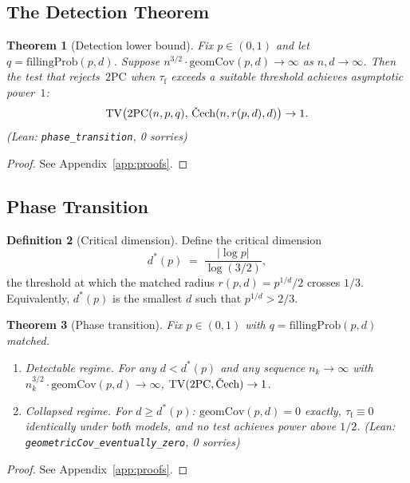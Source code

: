 \documentclass[reqno,12pt]{amsart}
\newcommand{\tauf}{\tau_{\mathrm{f}}}
\newcommand{\PC}{\mathrm{2PC}}
\newcommand{\Cech}{\ifmmode\text{\v{C}ech}\else\v{C}ech\fi}  %
\newcommand{\TV}{\mathrm{TV}}
\newcommand{\geomCov}{\mathrm{geomCov}}
\newcommand{\fillingP}{\mathrm{fillingProb}}
\newcommand{\leanverified}[1]{\textup{(Lean: \texttt{#1}, 0 sorries)}}
\theoremstyle{plain}
\newtheorem{theorem}{Theorem}[section]
\theoremstyle{definition}
\newtheorem{definition}[theorem]{Definition}
\theoremstyle{remark}
\begin{document}
\subsection{The Detection Theorem}

\begin{theorem}[Detection lower bound]\label{thm:detection}
Fix $p\in(0,1)$ and let $q = \fillingP(p,d)$. Suppose
$n^{3/2}\cdot\geomCov(p,d)\to\infty$ as $n,d\to\infty$.
Then the test that rejects~$\PC$ when $\tauf$ exceeds a suitable threshold achieves
asymptotic power~$1$:
\[
  \TV\bigl(\PC(n,p,q),\,\Cech(n,r(p,d),d)\bigr)\to 1.
\]
\hfill \leanverified{phase\_transition}
\end{theorem}

\begin{proof}
See Appendix~\ref{app:proofs}.
\end{proof}

\subsection{Phase Transition}

\begin{definition}[Critical dimension]\label{def:critical-dim}
Define the critical dimension
\begin{equation}\label{eq:critical-dim}
  d^*(p) \;=\; \frac{|\log p|}{\log(3/2)},
\end{equation}
the threshold at which the matched radius $r(p,d) = p^{1/d}/2$ crosses $1/3$.
Equivalently, $d^*(p)$ is the smallest $d$ such that $p^{1/d} > 2/3$.
\end{definition}

\begin{theorem}[Phase transition]\label{thm:phase-transition}
Fix $p\in(0,1)$ with $q = \fillingP(p,d)$ matched.
\begin{enumerate}[label=(\alph*)]
\item \textit{Detectable regime.} For any $d < d^*(p)$ and any sequence $n_k\to\infty$
  with $n_k^{3/2}\cdot\geomCov(p,d)\to\infty$,
  $\TV(\PC,\Cech)\to 1$.
\item \textit{Collapsed regime.} For $d \geq d^*(p)$: $\geomCov(p,d) = 0$ exactly,
  $\tauf \equiv 0$ identically under both models, and no test achieves power above $1/2$.
\hfill \leanverified{geometricCov\_eventually\_zero}
\end{enumerate}
\end{theorem}

\begin{proof}
See Appendix~\ref{app:proofs}.
\end{proof}
\end{document}
